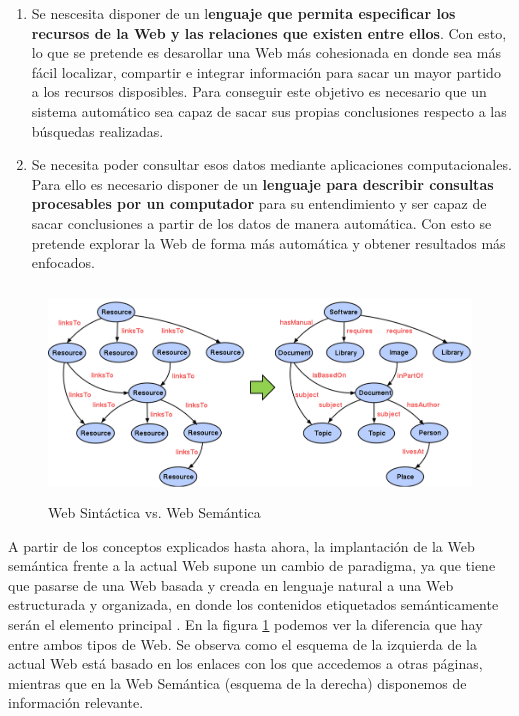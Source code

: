 \begin{enumerate}
	\item Se nescesita disponer de un l\textbf{enguaje que permita especificar los recursos de la Web y las relaciones que existen entre ellos}. Con esto, lo que se pretende es desarollar una Web más cohesionada en donde sea más fácil localizar, compartir e integrar información para sacar un mayor partido a los recursos disposibles. Para conseguir este objetivo es necesario que un sistema automático sea capaz de sacar sus propias conclusiones respecto a las búsquedas realizadas.
	
	\item Se necesita poder consultar esos datos mediante aplicaciones computacionales. Para ello es necesario disponer de un \textbf{lenguaje para describir consultas procesables por un computador} para su entendimiento y ser capaz de sacar conclusiones a partir de los datos de manera automática. Con esto se pretende explorar la Web de forma más automática y obtener resultados más enfocados.
\end{enumerate}

\begin{figure}[H]
	\centering
	\includegraphics[height=5.60cm]{imagenes/capitulo3/web-actual-web-semantica.png}
	\caption{Web Sintáctica vs. Web Semántica}
	\label{wa-ws}
\end{figure}

A partir de los conceptos explicados hasta ahora, la implantación de la Web semántica frente a la actual Web supone un cambio de paradigma, ya que tiene que pasarse de una Web basada y creada en lenguaje natural a una Web estructurada y organizada, en donde los contenidos etiquetados semánticamente serán el elemento principal \cite{researchgate}. En la figura \ref{wa-ws} podemos ver la diferencia que hay entre ambos tipos de Web. Se observa como el esquema de la izquierda de la actual Web está basado en los enlaces con los que accedemos a otras páginas, mientras que en la Web Semántica (esquema de la derecha) disponemos de información relevante.


